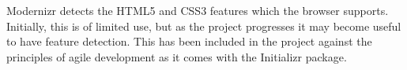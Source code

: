 Modernizr detects the HTML5 and CSS3 features which the browser supports. Initially, this is of limited use, but as the project progresses it may become useful to have feature detection. This has been included in the project against the principles of agile development as it comes with the Initializr package.




